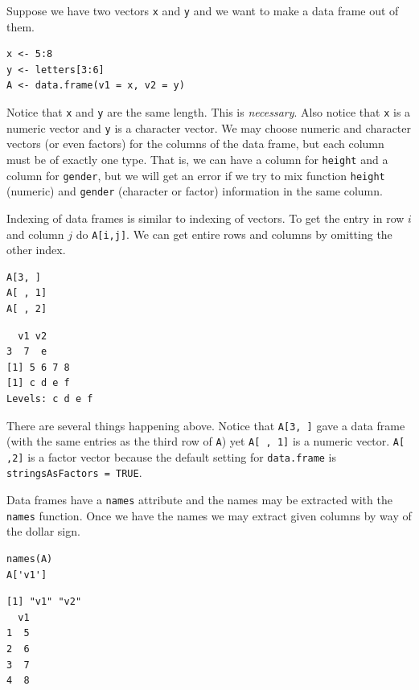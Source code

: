 \documentclass[10pt,english]{scrbook}
\begin{document}
\begin{exampletoo}
Suppose we have two vectors \texttt{x} and \texttt{y} and we want to make a data frame out of them.

\begin{verbatim}
x <- 5:8
y <- letters[3:6]
A <- data.frame(v1 = x, v2 = y)
\end{verbatim}

\end{exampletoo}
Notice that \texttt{x} and \texttt{y} are the same length. This is \emph{necessary}. Also notice that \texttt{x} is a numeric vector and \texttt{y} is a character vector. We may choose numeric and character vectors (or even factors) for the columns of the data frame, but each column must be of exactly one type. That is, we can have a column for \texttt{height} and a column for \texttt{gender}, but we will get an error if we try to mix function \texttt{height} (numeric) and \texttt{gender} (character or factor) information in the same column.

Indexing of data frames is similar to indexing of vectors. To get the entry in row \(i\) and column \(j\) do \texttt{A[i,j]}. We can get entire rows and columns by omitting the other index. 

\begin{verbatim}
A[3, ]
A[ , 1]
A[ , 2]
\end{verbatim}

\begin{verbatim}
  v1 v2
3  7  e
[1] 5 6 7 8
[1] c d e f
Levels: c d e f
\end{verbatim}

There are several things happening above. Notice that \texttt{A[3, ]} gave a data frame (with the same entries as the third row of \texttt{A}) yet \texttt{A[ , 1]} is a numeric vector. \texttt{A[ ,2]} is a factor vector because the default setting for \texttt{data.frame} is \texttt{stringsAsFactors = TRUE}.

Data frames have a \texttt{names} attribute and the names may be extracted with the \texttt{names} function. Once we have the names we may extract given columns by way of the dollar sign.

\begin{verbatim}
names(A)
A['v1']
\end{verbatim}

\begin{verbatim}
[1] "v1" "v2"
  v1
1  5
2  6
3  7
4  8
\end{verbatim}
\end{document}

